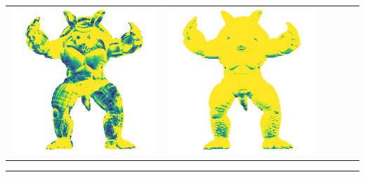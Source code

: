 \begin{center}
\begin{tabularx}{\linewidth}{@{}Y@{}Y@{}Y@{}Y@{}Y@{}Y@{}}
\includegraphics[width=\linewidth]{semisynthetic/20150514_22_marrnet_err.png} &
\includegraphics[width=\linewidth]{semisynthetic/20150514_22_ef_err.png} \\
\end{tabularx}
\begin{center}\rule{0.5\linewidth}{\linethickness}\end{center}


\end{center}
